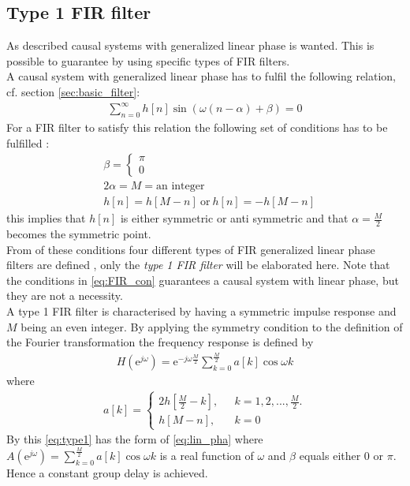 \subsection{Type 1 FIR filter}
As described causal systems with generalized linear phase is wanted. This is possible to guarantee by using specific types of FIR filters.\\
A causal system with generalized linear phase has to fulfil the following relation, cf. section \ref{sec:basic_filter}:
\begin{align}
\sum_{n=0}^{\infty}h[n]\sin\left(\omega \left(n-\alpha \right) + \beta \right) = 0
\end{align}
For a FIR filter to satisfy this relation the following set of conditions has to be fulfilled \cite{DTSP, p.342}:
\begin{align} \label{eq:FIR_con}
&\beta = \left\{ \begin{matrix} 
\pi  \\
0 
\end{matrix}\right. \nonumber  \\ 
&2\alpha = M = \text{an integer} \\ 
&h[n]=h[M-n] \ \text{or} \ h[n]=-h[M-n] \nonumber  
\end{align} 
this implies that $h[n]$ is either symmetric or anti symmetric and that $\alpha = \frac{M}{2}$ becomes the symmetric point. \\
From of these conditions four different types of FIR generalized linear phase filters are defined \cite{DTSP, p. 343}, only the \textit{type 1 FIR filter} will be elaborated here. Note that the conditions in \eqref{eq:FIR_con} guarantees a causal system with linear phase, but they are not a necessity. \\
A type 1 FIR filter is characterised by having a symmetric impulse response and $M$ being an even integer. By applying the symmetry condition to the definition of the Fourier transformation the frequency response is defined by   
\begin{align}\label{eq:type1}
H(\text{e}^{j\omega})=\text{e}^{-j\omega \frac{M}{2}} \sum_{k=0}^{\frac{M}{2}} a[k]\cos \omega k
\end{align}
where 
\begin{align}
a[k]= \left\{ \begin{matrix}
2h\left[ \frac{M}{2} - k \right], \ \ &\ k=1,2,... , \frac{M}{2}.   \\
h[M-n], \ \ &\ k = 0  
\end{matrix}\right.
\end{align}
By this \eqref{eq:type1} has the form of \eqref{eq:lin_pha} where $A(\text{e}^{j\omega})= \sum_{k=0}^{\frac{M}{2}} a[k]\cos \omega k$ is a real function of $\omega$ and $\beta$ equals either 0 or $\pi$. Hence a constant group delay is achieved.








   
 


 



